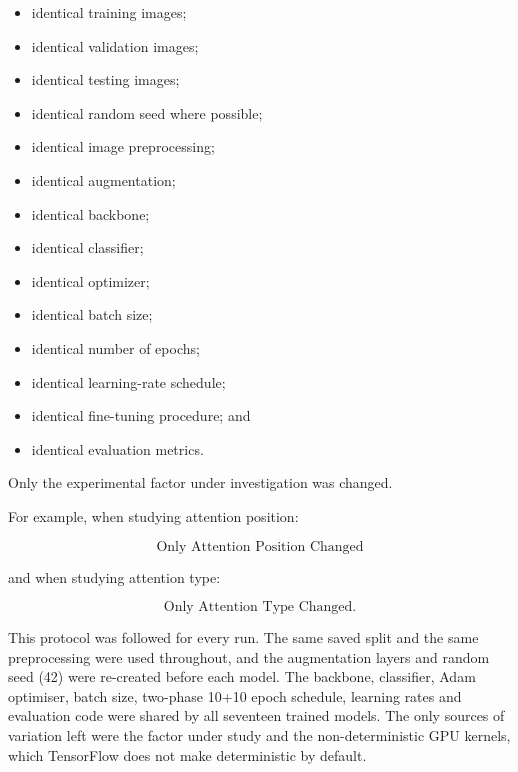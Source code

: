 \documentclass[10pt]{article}
\begin{document}
\begin{itemize}

\item identical training images;

\item identical validation images;

\item identical testing images;

\item identical random seed where possible;

\item identical image preprocessing;

\item identical augmentation;

\item identical backbone;

\item identical classifier;

\item identical optimizer;

\item identical batch size;

\item identical number of epochs;

\item identical learning-rate schedule;

\item identical fine-tuning procedure; and

\item identical evaluation metrics.

\end{itemize}

Only the experimental factor under investigation was changed.

For example, when studying attention position:

\[
\boxed{
\text{Only Attention Position Changed}
}
\]

and when studying attention type:

\[
\boxed{
\text{Only Attention Type Changed}.
}
\]

This protocol was followed for every run. The same saved split and the same
preprocessing were used throughout, and the augmentation layers and random seed
(42) were re-created before each model. The backbone, classifier, Adam optimiser,
batch size, two-phase 10+10 epoch schedule, learning rates and evaluation code
were shared by all seventeen trained models. The only sources of variation left
were the factor under study and the non-deterministic GPU kernels, which TensorFlow
does not make deterministic by default.
\end{document}
